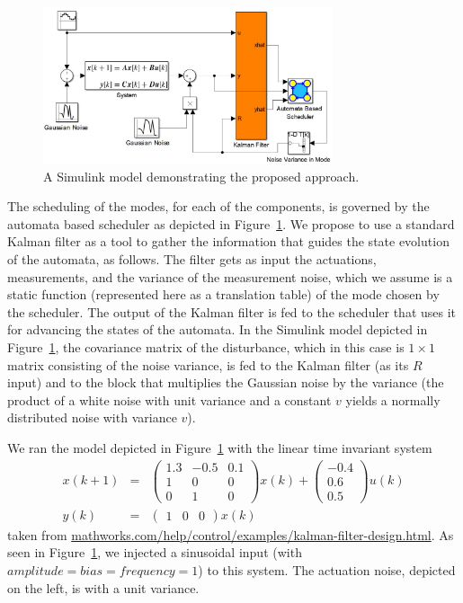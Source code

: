 \documentclass{sig-alternate-ipsn13}
\begin{document}
\begin{figure}%
	\centerline{\includegraphics[width=85mm]{SimulinkModel.jpg}}
	\caption{A Simulink model demonstrating the proposed approach.}
	\label{fig:simulink}
\end{figure}

The scheduling of the modes, for each of the components, is governed by the automata based scheduler as depicted in Figure~\ref{fig:simulink}. We propose to use a standard Kalman filter as a tool to gather the information that guides the state evolution of the automata, as follows. The filter gets as input the actuations,  measurements, and the variance of the measurement noise, which we assume is a static function (represented here as a translation table) of the mode chosen by the scheduler. The output of the Kalman filter is fed to the scheduler that uses it for advancing the states of the automata. In the Simulink model depicted in Figure~\ref{fig:simulink}, the covariance matrix of the disturbance, which in this case is $1 \times 1$ matrix consisting of the noise variance, is fed to the Kalman filter (as its $R$ input) and to the block that multiplies the Gaussian noise by the variance (the product of a white noise with unit variance and a constant $v$ yields a normally distributed noise with variance $v$).

We ran the model depicted in Figure~\ref{fig:simulink} with the linear time invariant system
\begin{eqnarray*}
x(k+1) &=& \begin{pmatrix}
	1.3  & -0.5  & 0.1 \\
	1    & 0     & 0 \\
	0    & 1     & 0
\end{pmatrix}x(k)+ 
\begin{pmatrix}
-0.4 \\
0.6\\
0.5\end{pmatrix} u(k) \\
y(k)&=& \begin{pmatrix}1 & 0 &0\end{pmatrix}x(k)
\end{eqnarray*}
taken from \url{mathworks.com/help/control/examples/kalman-filter-design.html}. As seen in Figure~\ref{fig:simulink}, we injected a sinusoidal input (with $amplitude=bias=frequency=1$) to this system. 
The actuation noise, depicted on the left, is with a unit variance. 
\end{document}
